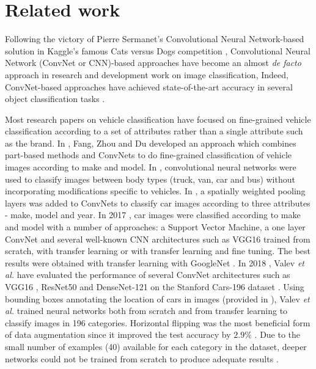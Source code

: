 \documentclass[conference]{IEEEtran}
\begin{document}
\section{Related work} \label{section:related}
Following the victory of Pierre Sermanet's Convolutional Neural Network-based solution in Kaggle's famous Cats versus Dogs competition \cite{kagcatdog}, Convolutional Neural Network (ConvNet or CNN)-based approaches have become an almost \textit{de facto} approach in research and development work on image classification, Indeed, ConvNet-based approaches have achieved state-of-the-art accuracy in several object classification tasks \cite{simonyan2014very}. 

Most research papers on vehicle classification have focused on fine-grained vehicle classification according to a set of attributes rather than a single attribute such as the brand. In \cite{7744550}, Fang, Zhou and Du developed an approach which combines part-based methods and ConvNets to do fine-grained classification of vehicle images according to make and model. In \cite{7535529}, convolutional neural networks were used to classify images between body types (truck, van, car and bus) without incorporating modifications specific to vehicles. In \cite{7891907}, a spatially weighted pooling layers was added to ConvNets to classify car images according to three attributes - make, model and year. In 2017 \cite{liu2017monza}, car images were classified according to make and model with a number of approaches: a Support Vector Machine, a one layer ConvNet and several well-known CNN architectures such as VGG16 \cite{krizhevsky2012imagenet} trained from scratch, with transfer learning or with transfer learning and fine tuning. The best results were obtained with transfer learning with GoogleNet \cite{Szegedy2015CVPR}. In 2018 \cite{valev2018systematic}, Valev \textit{et al.} have evaluated the performance of several ConvNet architectures such as VGG16 \cite{krizhevsky2012imagenet}, ResNet50 \cite{he2016deep} and DenseNet-121 \cite{huang2017densely} on the Stanford Cars-196 dataset \cite{KrauseStarkDengFei-Fei3DRR2013}. Using bounding boxes annotating the location of cars in images (provided in \cite{KrauseStarkDengFei-Fei3DRR2013}), Valev \textit{et al.} trained neural networks both from scratch and from transfer learning to classify images in 196 categories. Horizontal flipping was the most beneficial form of data augmentation since it improved the test accuracy by $2.9\%$ \cite{valev2018systematic}. Due to the small number of examples (40) available for each category in the dataset, deeper networks could not be trained from scratch to produce adequate results \cite{valev2018systematic}.
\end{document}
